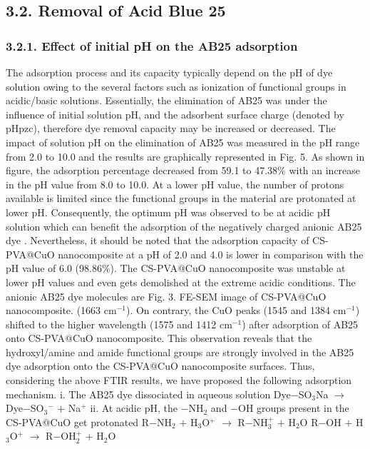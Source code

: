 \documentclass[final,5p,times,twocolumn,authoryear]{elsarticle}
\begin{document}
\subsection{3.2. Removal of Acid Blue 25}
\subsubsection{3.2.1. Effect of initial pH on the AB25 adsorption}
The adsorption process and its capacity typically depend on the pH of dye solution owing to the several factors such as ionization of functional groups in acidic/basic solutions. Essentially, the elimination of AB25 was under the influence of initial solution pH, and the adsorbent surface charge (denoted by pHpzc), therefore dye removal capacity may be increased or decreased.
The impact of solution pH on the elimination of AB25 was measured in the pH range from 2.0 to 10.0 and the results are graphically represented in Fig. 5. As shown in figure, the adsorption percentage decreased from 59.1 to 47.38\% with an increase in the pH value from 8.0 to 10.0. At a lower pH value, the number of protons available is limited since the functional groups in the material are protonated at lower pH. Consequently, the optimum pH was observed to be at acidic pH solution which can benefit the adsorption of the negatively charged anionic AB25 dye \cite{35}. Nevertheless, it should be noted that the adsorption capacity of CS-PVA@CuO nanocomposite at a pH of 2.0 and 4.0 is lower in comparison with the pH value of 6.0 (98.86\%). The CS-PVA@CuO nanocomposite was unstable at lower pH values and even gets demolished at the extreme acidic conditions. The anionic AB25 dye molecules are
Fig. 3. FE-SEM image of CS-PVA@CuO nanocomposite.
(1663 cm$^{-1}$). On contrary, the CuO peaks (1545 and 1384 cm$^{-1}$) shifted to the higher wavelength (1575 and 1412 cm$^{-1}$) after adsorption of AB25 onto CS-PVA@CuO nanocomposite. This observation reveals that the hydroxyl/amine and amide functional groups are strongly involved in the AB25 dye adsorption onto the CS-PVA@CuO nanocomposite surfaces. Thus, considering the above FTIR results, we have proposed the following adsorption mechanism.
i. The AB25 dye dissociated in aqueous solution
Dye$-$SO$_3$Na $\rightarrow$ Dye$-$SO$_3$$^{-}$ $+$ Na$^{+}$
ii. At acidic pH, the $-$NH$_2$ and $-$OH groups present in the CS-PVA@CuO
get protonated
R$-$NH$_2$ $+$ H$_3$O$^{+}$ $\rightarrow$ R$-$NH$_3^{+}$ $+$ H$_2$O
R$-$OH $+$ H$_3$O$^{+}$ $\rightarrow$ R$-$OH$_2^{+}$ $+$ H$_2$O
\end{document}
